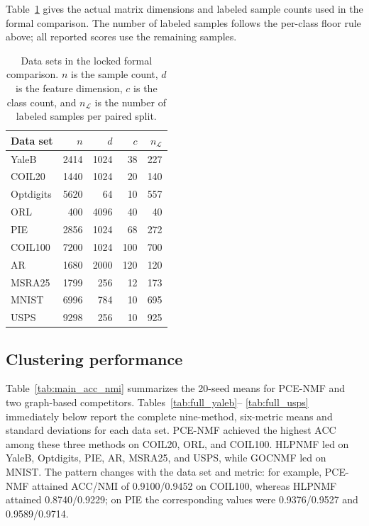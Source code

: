 \documentclass[preprint,12pt]{elsarticle}
\theoremstyle{remark}
\begin{document}
Table~\ref{tab:datasets} gives the actual matrix dimensions and labeled
sample counts used in the formal comparison. The number of labeled
samples follows the per-class floor rule above; all reported scores
use the remaining samples.

\begin{table}[!htbp]
\centering
\caption{Data sets in the locked formal comparison. $n$ is the sample
count, $d$ is the feature dimension, $c$ is the class count, and
$n_{\mathcal L}$ is the number of labeled samples per paired split.}
\label{tab:datasets}
\small
\begin{tabular}{lrrrr}
\toprule
Data set & $n$ & $d$ & $c$ & $n_{\mathcal L}$ \\
\midrule
YaleB     & 2414 & 1024 & 38  & 227 \\
COIL20    & 1440 & 1024 & 20  & 140 \\
Optdigits & 5620 & 64   & 10  & 557 \\
ORL       & 400  & 4096 & 40  & 40  \\
PIE       & 2856 & 1024 & 68  & 272 \\
COIL100   & 7200 & 1024 & 100 & 700 \\
AR        & 1680 & 2000 & 120 & 120 \\
MSRA25    & 1799 & 256  & 12  & 173 \\
MNIST     & 6996 & 784  & 10  & 695 \\
USPS      & 9298 & 256  & 10  & 925 \\
\bottomrule
\end{tabular}
\end{table}

\subsection{Clustering performance}

Table~\ref{tab:main_acc_nmi} summarizes the 20-seed means for PCE-NMF
and two graph-based competitors. Tables~\ref{tab:full_yaleb}--
\ref{tab:full_usps} immediately below report the complete nine-method,
six-metric means and standard deviations for each data set. PCE-NMF achieved the
highest ACC among these three methods on COIL20, ORL, and COIL100.
HLPNMF led on YaleB, Optdigits, PIE, AR, MSRA25, and USPS, while
GOCNMF led on MNIST. The pattern changes with the data set and metric:
for example, PCE-NMF attained ACC/NMI of 0.9100/0.9452 on COIL100,
whereas HLPNMF attained 0.8740/0.9229; on PIE the corresponding values
were 0.9376/0.9527 and 0.9589/0.9714.
\end{document}

